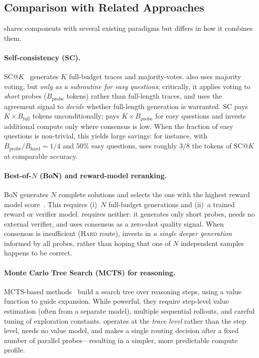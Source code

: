 \subsection{Comparison with Related Approaches}
\label{sec:method:comparison}

\method{} shares components with several existing paradigms but differs in
how it combines them.

\paragraph{Self-consistency (SC).}
SC@$K$~\citep{wang2023selfconsistency} generates $K$ full-budget
traces and majority-votes.
\method{} also uses majority voting, but \emph{only as a subroutine for
easy questions}; critically, it applies voting to \emph{short} probes
($B_{\mathrm{probe}}$ tokens) rather than full-length traces, and uses the
agreement signal to \emph{decide} whether full-length generation is
warranted.
SC pays $K \times B_{\mathrm{full}}$ tokens unconditionally; \method{}
pays $K \times B_{\mathrm{probe}}$ for easy questions and invests
additional compute only where consensus is low.
When the fraction of easy questions is non-trivial, this yields large
savings: for instance, with $B_{\mathrm{probe}} / B_{\mathrm{hard}} = 1/4$
and 50\% easy questions, \method{} uses roughly $3/8$ the tokens of SC@$K$
at comparable accuracy.

\paragraph{Best-of-$N$ (BoN) and reward-model reranking.}
BoN generates $N$ complete solutions and selects the one with the highest
reward model score~\citep{cobbe2021training,lightman2024lets}.
This requires (i)~$N$ full-budget generations and (ii)~a trained reward or
verifier model.
\method{} requires neither: it generates only short probes, needs no
external verifier, and uses consensus as a zero-shot quality signal.
When consensus is insufficient (\textsc{Hard} route), \method{} invests in
\emph{a single deeper generation} informed by all probes, rather than hoping
that one of $N$ independent samples happens to be correct.

\paragraph{Monte Carlo Tree Search (MCTS) for reasoning.}
MCTS-based methods~\citep{hao2023reasoning,xie2024selfevaluation} build a
search tree over reasoning steps, using a value function to guide
expansion.
While powerful, they require step-level value estimation (often from a
separate model), multiple sequential rollouts, and careful tuning of
exploration constants.
\method{} operates at the \emph{trace level} rather than the step level,
needs no value model, and makes a single routing decision after a fixed
number of parallel probes---resulting in a simpler, more predictable
compute profile.

